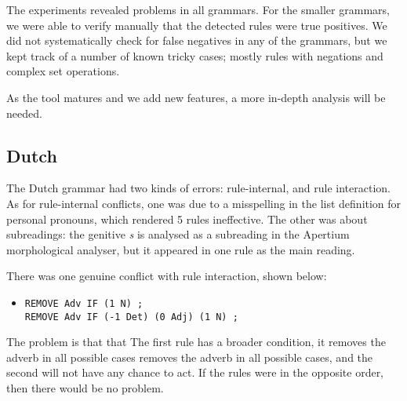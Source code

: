 The experiments revealed problems in all grammars. For the smaller
grammars, we were able to verify manually that the detected rules were
true positives.
We did not systematically check for false negatives in any of the
grammars, but we kept track of a number of known tricky cases; mostly
rules with negations and complex set operations.

As the tool matures and we add new features, a more in-depth analysis
will be needed.

\subsection{Dutch} The Dutch grammar had two kinds of errors: rule-internal, and rule interaction. As for rule-internal conflicts, one was due to a misspelling in the list definition for personal pronouns, which rendered 5 rules ineffective. The other was about subreadings: the genitive \emph{s} is analysed as a subreading in the Apertium morphological analyser, but it appeared in one rule as the main reading. 

There was one genuine conflict with rule interaction, shown below:

\begin{itemize}
\item[] 
\begin{verbatim}REMOVE Adv IF (1 N) ;
REMOVE Adv IF (-1 Det) (0 Adj) (1 N) ;
\end{verbatim}
\end{itemize}

The problem is that that
The first rule has a broader condition, 
it removes the adverb in all possible cases 
 removes the adverb in all possible cases, and the second will not have any chance to act. If the rules were in the opposite order, then there would be no problem.



